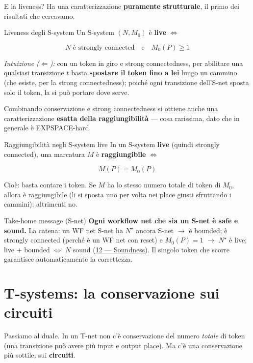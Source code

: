 E la liveness? Ha una caratterizzazione \textbf{puramente strutturale}, il primo dei risultati che cercavamo.

\begin{boxtheorem}{Liveness degli S-system}
Un S-system $(N, M_0)$ è \textbf{live} $\iff$

\[
N \text{ è strongly connected} \quad \text{e} \quad M_0(P) \ge 1
\]

\emph{Intuizione ($\Leftarrow$):} con un token in giro e strong connectedness, per abilitare una qualsiasi transizione $t$ basta \textbf{spostare il token fino a lei} lungo un cammino (che esiste, per la strong connectedness); poiché ogni transizione dell'S-net sposta solo il token, la si può portare dove serve.
\end{boxtheorem}

Combinando conservazione e strong connectedness si ottiene anche una caratterizzazione \textbf{esatta della raggiungibilità} — cosa rarissima, dato che in generale è EXPSPACE-hard.

\begin{boxtheorem}{Raggiungibilità negli S-system live}
In un S-system \textbf{live} (quindi strongly connected), una marcatura $M$ è \textbf{raggiungibile} $\iff$

\[
M(P) = M_0(P)
\]

Cioè: basta contare i token. Se $M$ ha lo stesso numero totale di token di $M_0$, allora è raggiungibile (li si sposta uno per volta nei place giusti sfruttando i cammini); altrimenti no.
\end{boxtheorem}

\begin{boxtip}{Take-home message (S-net)}
\textbf{Ogni workflow net che sia un S-net è safe e sound.} La catena: un WF net S-net ha $N^\star$ ancora S-net $\rightarrow$ è bounded; è strongly connected (perché è un WF net con reset) e $M_0(P)=1$ $\rightarrow$ $N^\star$ è live; live + bounded $\iff$ $N$ sound (\hyperref[ch:12]{12 — Soundness}). Il singolo token che scorre garantisce automaticamente la correttezza.
\end{boxtip}

\section{\texorpdfstring{T-systems: la conservazione sui circuiti}{T-systems: la conservazione sui circuiti}}

Passiamo al duale. In un T-net non c'è conservazione del numero \emph{totale} di token (una transizione può avere più input e output place). Ma c'è una conservazione più sottile, sui \textbf{circuiti}.

